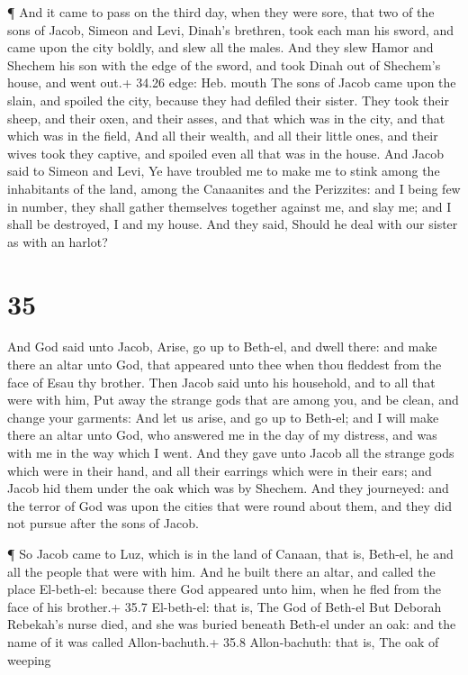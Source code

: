  ¶ And it came to pass on the third day, when they were
sore, that two of the sons of Jacob, Simeon and Levi, Dinah's brethren,
took each man his sword, and came upon the city boldly, and slew all the
males.  And they slew Hamor and Shechem his son with the
edge of the sword, and took Dinah out of Shechem's house, and went out.+
34.26 edge: Heb. mouth  The sons of Jacob came upon the
slain, and spoiled the city, because they had defiled their sister.
 They took their sheep, and their oxen, and their asses,
and that which was in the city, and that which was in the field,
 And all their wealth, and all their little ones, and their
wives took they captive, and spoiled even all that was in the house.
 And Jacob said to Simeon and Levi, Ye have troubled me to
make me to stink among the inhabitants of the land, among the Canaanites
and the Perizzites: and I being few in number, they shall gather
themselves together against me, and slay me; and I shall be destroyed, I
and my house.  And they said, Should he deal with our
sister as with an harlot?

\hypertarget{section-34}{%
\section{35}\label{section-34}}

 And God said unto Jacob, Arise, go up to Beth-el, and dwell
there: and make there an altar unto God, that appeared unto thee when
thou fleddest from the face of Esau thy brother.  Then Jacob
said unto his household, and to all that were with him, Put away the
strange gods that are among you, and be clean, and change your garments:
 And let us arise, and go up to Beth-el; and I will make
there an altar unto God, who answered me in the day of my distress, and
was with me in the way which I went.  And they gave unto
Jacob all the strange gods which were in their hand, and all their
earrings which were in their ears; and Jacob hid them under the oak
which was by Shechem.  And they journeyed: and the terror of
God was upon the cities that were round about them, and they did not
pursue after the sons of Jacob.

 ¶ So Jacob came to Luz, which is in the land of Canaan,
that is, Beth-el, he and all the people that were with him. 
And he built there an altar, and called the place El-beth-el: because
there God appeared unto him, when he fled from the face of his brother.+
35.7 El-beth-el: that is, The God of Beth-el  But Deborah
Rebekah's nurse died, and she was buried beneath Beth-el under an oak:
and the name of it was called Allon-bachuth.+ 35.8 Allon-bachuth: that
is, The oak of weeping


